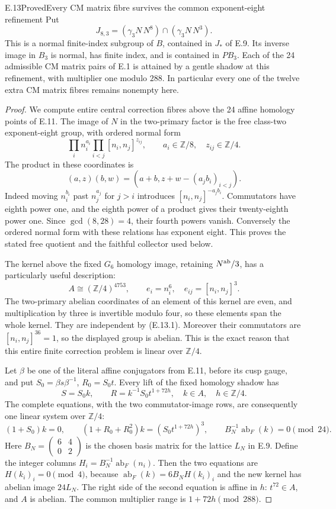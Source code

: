 \begin{statement}{E.13}{Proved}{Every CM matrix fibre survives the common exponent-eight refinement}
Put
\[
 J_{8,3}=(\gamma_3N\,N^8)\cap(\gamma_3N\,N^3).
\]
This is a normal finite-index subgroup of $B$, contained in $J_*$
of E.9. Its inverse image in $B_3$ is normal, has finite index,
and is contained in $PB_3$. Each of the 24 admissible CM matrix
pairs of E.1 is attained by a gentle shadow at this refinement,
with multiplier one modulo $288$. In particular every one of
the twelve extra CM matrix fibres remains nonempty here.
\end{statement}
\begin{proof}
We compute entire central correction fibres above the 24 affine
homology points of E.11. The image of $N$ in the two-primary
factor is the free class-two exponent-eight group, with ordered
normal form
\[
 \prod_i n_i^{a_i}\prod_{i<j}[n_i,n_j]^{z_{ij}},
 \qquad a_i\in\mathbb Z/8,\quad z_{ij}\in\mathbb Z/4.
 \tag{E.13.1}
\]
The product in these coordinates is
\[
 (a,z)(b,w)=(a+b,z+w-(a_jb_i)_{i<j}).
 \tag{E.13.2}
\]
Indeed moving $n_i^{b_i}$ past $n_j^{a_j}$ for $j>i$
introduces $[n_i,n_j]^{-a_jb_i}$. Commutators have eighth
power one, and the eighth power of a product gives their
twenty-eighth power one. Since $\gcd(8,28)=4$, their fourth
powers vanish. Conversely the ordered normal form with
these relations has exponent eight. This proves the stated free quotient
and the faithful collector used below.

The kernel above the fixed $G_6$ homology image, retaining
$N^{\rm ab}/3$, has a particularly useful description:
\[
 A\cong(\mathbb Z/4)^{4753},\qquad
 e_i=n_i^6,
 \quad e_{ij}=[n_i,n_j]^3.
 \tag{E.13.3}
\]
The two-primary abelian coordinates of an element of this
kernel are even, and multiplication by three is invertible
modulo four, so these elements span the whole kernel.
They are independent by (E.13.1). Moreover their commutators
are $[n_i,n_j]^{36}=1$, so the displayed group is abelian.
This is the exact reason that this entire finite correction
problem is linear over $\mathbb Z/4$.

Let $\beta$ be one of the literal affine conjugators from
E.11, before its cusp gauge, and put $S_0=\beta s\beta^{-1}$,
$R_0=S_0t$. Every lift of the fixed homology shadow has
\[
 S=S_0k,\qquad
 R=k^{-1}S_0t^{1+72h},
 \quad k\in A,\quad h\in\mathbb Z/4.
\]
The complete equations, with the two commutator-image rows,
are consequently one linear system over $\mathbb Z/4$:
\[
 (1+S_0)k=0,\qquad
 (1+R_0+R_0^2)k=(S_0t^{1+72h})^3,
 \qquad B_N^{-1}\operatorname{ab}_F(k)=0\pmod {24}.
 \tag{E.13.4}
\]
Here $B_N=\left(\begin{smallmatrix}6&4\\0&2\end{smallmatrix}\right)$
is the chosen basis matrix for the lattice $L_N$ in E.9.
Define the integer columns $H_i=B_N^{-1}\operatorname{ab}_F(n_i)$.
Then
the two equations are $H(k_i)_i=0\pmod4$, because
$\operatorname{ab}_F(k)=6B_NH(k_i)_i$ and the new kernel
has abelian image $24L_N$. The right side of the second
equation is affine in $h$: $t^{72}\in A$, and $A$ is abelian.
The common multiplier range is $1+72h\pmod{288}$.


\end{proof}
